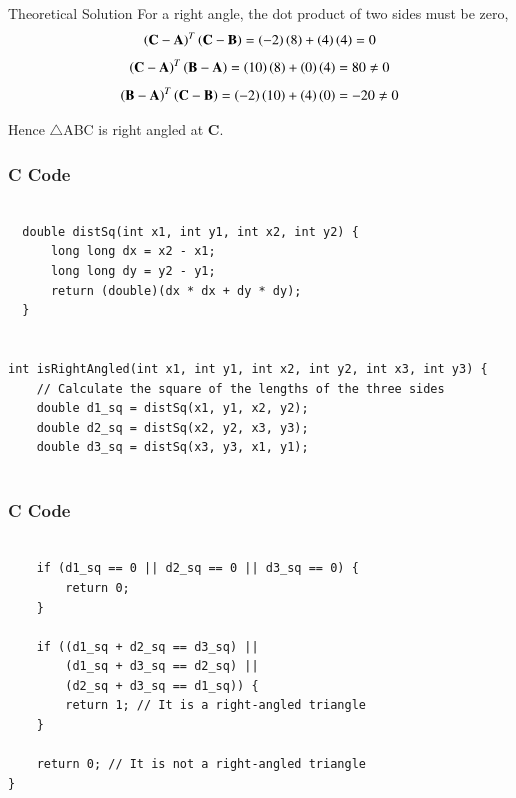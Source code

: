 \documentclass{beamer}
\begin{document}
\begin{frame}{Theoretical Solution}
For a right angle, the dot product of two sides must be zero,
\begin{align}
\left(\mathbf{C}-\mathbf{A}\right)^T\left(\mathbf{C}-\mathbf{B}\right)=\left(-2\right)\left(8\right)+\left(4\right)\left(4\right)=0
\end{align}
\begin{align}
\left(\mathbf{C}-\mathbf{A}\right)^T\left(\mathbf{B}-\mathbf{A}\right)=\left(10\right)\left(8\right)+\left(0\right)\left(4\right)=80\neq 0
\end{align}
\begin{align}
\left(\mathbf{B}-\mathbf{A}\right)^T\left(\mathbf{C}-\mathbf{B}\right)=\left(-2\right)\left(10\right)+\left(4\right)\left(0\right)=-20\neq 0
\end{align}

Hence $\triangle$ABC is right angled at \textbf{C}.

\end{frame}
\begin{frame}[fragile]
\frametitle{C Code }
\begin{lstlisting}

  double distSq(int x1, int y1, int x2, int y2) {
      long long dx = x2 - x1;
      long long dy = y2 - y1;
      return (double)(dx * dx + dy * dy);
  }


int isRightAngled(int x1, int y1, int x2, int y2, int x3, int y3) {
    // Calculate the square of the lengths of the three sides
    double d1_sq = distSq(x1, y1, x2, y2);
    double d2_sq = distSq(x2, y2, x3, y3);
    double d3_sq = distSq(x3, y3, x1, y1);
    
\end{lstlisting}
\end{frame}  
\begin{frame}[fragile]
\frametitle{C Code }
\begin{lstlisting}

    if (d1_sq == 0 || d2_sq == 0 || d3_sq == 0) {
        return 0;
    }

    if ((d1_sq + d2_sq == d3_sq) ||
        (d1_sq + d3_sq == d2_sq) ||
        (d2_sq + d3_sq == d1_sq)) {
        return 1; // It is a right-angled triangle
    }

    return 0; // It is not a right-angled triangle
}

\end{lstlisting}
\end{frame}  
\end{document}

